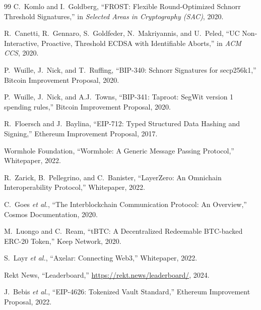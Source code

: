 \documentclass[11pt,twocolumn]{article}
\begin{document}
\begin{thebibliography}{99}
 C.~Komlo and I.~Goldberg, ``FROST: Flexible Round-Optimized Schnorr Threshold Signatures,'' in \emph{Selected Areas in Cryptography (SAC)}, 2020.

 R.~Canetti, R.~Gennaro, S.~Goldfeder, N.~Makriyannis, and U.~Peled, ``UC Non-Interactive, Proactive, Threshold ECDSA with Identifiable Aborts,'' in \emph{ACM CCS}, 2020.

 P.~Wuille, J.~Nick, and T.~Ruffing, ``BIP-340: Schnorr Signatures for secp256k1,'' Bitcoin Improvement Proposal, 2020.

 P.~Wuille, J.~Nick, and A.J.~Towns, ``BIP-341: Taproot: SegWit version 1 spending rules,'' Bitcoin Improvement Proposal, 2020.

 R.~Floersch and J.~Baylina, ``EIP-712: Typed Structured Data Hashing and Signing,'' Ethereum Improvement Proposal, 2017.

 Wormhole Foundation, ``Wormhole: A Generic Message Passing Protocol,'' Whitepaper, 2022.

 R.~Zarick, B.~Pellegrino, and C.~Banister, ``LayerZero: An Omnichain Interoperability Protocol,'' Whitepaper, 2022.

 C.~Goes \emph{et al.}, ``The Interblockchain Communication Protocol: An Overview,'' Cosmos Documentation, 2020.

 M.~Luongo and C.~Ream, ``tBTC: A Decentralized Redeemable BTC-backed ERC-20 Token,'' Keep Network, 2020.

 S.~Layr \emph{et al.}, ``Axelar: Connecting Web3,'' Whitepaper, 2022.

 Rekt News, ``Leaderboard,'' \url{https://rekt.news/leaderboard/}, 2024.

 J.~Bebis \emph{et al.}, ``EIP-4626: Tokenized Vault Standard,'' Ethereum Improvement Proposal, 2022.
\end{thebibliography}
\end{document}
